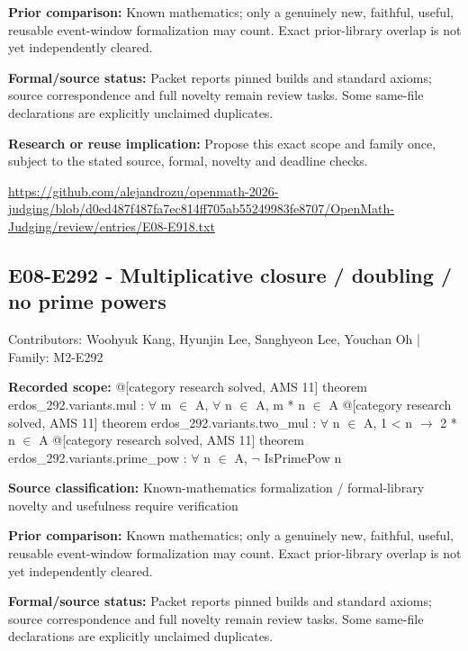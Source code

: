 \documentclass[11pt,a4paper]{article}
\begin{document}
\textbf{Prior comparison:} Known mathematics; only a genuinely new, faithful, useful, reusable event-window formalization may count. Exact prior-library overlap is not yet independently cleared.

\textbf{Formal/source status:} Packet reports pinned builds and standard axioms; source correspondence and full novelty remain review tasks. Some same-file declarations are explicitly unclaimed duplicates.

\textbf{Research or reuse implication:} Propose this exact scope and family once, subject to the stated source, formal, novelty and deadline checks.

{\small \url{https://github.com/alejandrozu/openmath-2026-judging/blob/d0ed487f487fa7ec814ff705ab55249983fe8707/OpenMath-Judging/review/entries/E08-E918.txt}\par}

\begin{samepage}
\subsection{E08-E292  -  Multiplicative closure / doubling / no prime powers}
{\small Contributors: Woohyuk Kang, Hyunjin Lee, Sanghyeon Lee, Youchan Oh | Family: M2-E292\par}

\textbf{Recorded scope:} @[category research solved, AMS 11] theorem erdos\_292.variants.mul : \ensuremath{\forall} m \ensuremath{\in} A, \ensuremath{\forall} n \ensuremath{\in} A, m * n \ensuremath{\in} A
@[category research solved, AMS 11] theorem erdos\_292.variants.two\_mul : \ensuremath{\forall} n \ensuremath{\in} A, 1 < n \ensuremath{\to} 2 * n \ensuremath{\in} A
@[category research solved, AMS 11] theorem erdos\_292.variants.prime\_pow : \ensuremath{\forall} n \ensuremath{\in} A, \ensuremath{\neg} IsPrimePow n


\end{samepage}
\textbf{Source classification:} Known-mathematics formalization / formal-library novelty and usefulness require verification

\textbf{Prior comparison:} Known mathematics; only a genuinely new, faithful, useful, reusable event-window formalization may count. Exact prior-library overlap is not yet independently cleared.

\textbf{Formal/source status:} Packet reports pinned builds and standard axioms; source correspondence and full novelty remain review tasks. Some same-file declarations are explicitly unclaimed duplicates.
\end{document}
